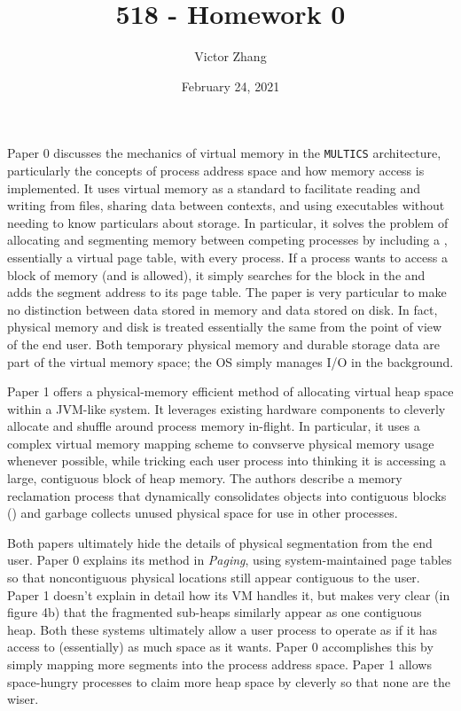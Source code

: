 \documentclass{article}
\title{518 - Homework 0}
\author{Victor Zhang}
\date{February 24, 2021}
\begin{document}
\maketitle

Paper 0 discusses the mechanics of virtual memory in the \verb|MULTICS| architecture, particularly the concepts of process address space and how memory access is implemented. It uses virtual memory as a standard to facilitate reading and writing from files, sharing data between contexts, and using executables without needing to know particulars about storage. In particular, it solves the problem of allocating and segmenting memory between competing processes by including a , essentially a virtual page table, with every process. If a process wants to access a block of memory (and is allowed), it simply searches for the block in the  and adds the segment address to its page table. The paper is very particular to make no distinction between data stored in memory and data stored on disk. In fact, physical memory and disk is treated essentially the same from the point of view of the end user. Both temporary physical memory and durable storage data are part of the virtual memory space; the OS simply manages I/O in the background.

Paper 1 offers a physical-memory efficient method of allocating virtual heap space within a JVM-like system. It leverages existing hardware components to cleverly allocate and shuffle around process memory in-flight. In particular, it uses a complex virtual memory mapping scheme to convserve physical memory usage whenever possible, while tricking each user process into thinking it is accessing a large, contiguous block of heap memory. The authors describe a memory reclamation process that dynamically consolidates objects into contiguous blocks () and garbage collects unused physical space for use in other processes.

Both papers ultimately hide the details of physical segmentation from the end user. Paper 0 explains its method in \textit{Paging}, using system-maintained page tables so that noncontiguous physical locations still appear contiguous to the user. Paper 1 doesn't explain in detail how its VM handles it, but makes very clear (in figure 4b) that the fragmented sub-heaps similarly appear as one contiguous heap. Both these systems ultimately allow a user process to operate as if it has access to (essentially) as much space as it wants. Paper 0 accomplishes this by simply mapping more segments into the process address space. Paper 1 allows space-hungry processes to claim more heap space by cleverly  so that none are the wiser.
\end{document}
